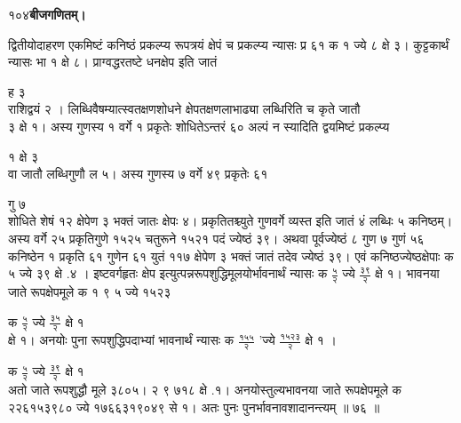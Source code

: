 \documentclass[11pt, openany]{book}
\begin{document}
\onehalfspacing
१०४\hspace{2in}\textbf{बीजगणितम्।} 

\vspace{5mm}

\begin{sloppypar}

\hangindent=0.2in द्वितीयोदाहरण एकमिष्टं कनिष्ठं प्रकल्प्य रूपत्रयं क्षेपं च प्रकल्प्य न्यासः प्र ६१ क १ ज्ये ८ क्षे ३। कुट्टकार्थं न्यासः भा १ क्षे ८। प्राग्वद्धरतष्टे धनक्षेप इति जातं 

\hspace{1.25in}ह ३\\ 

\hangindent=0.2in राशिद्वयं २ । लिब्धिवैषम्यात्स्वतक्षणशोधने क्षेपतक्षणलाभाढ्या लब्धिरिति च कृते जातौ \\३ क्षे १। अस्य गुणस्य १ वर्गे १ प्रकृतेः शोधितेऽन्तरं ६० अल्पं न स्यादिति द्वयमिष्टं प्रकल्प्य

१ क्षे ३\\

\hangindent=0.2in वा जातौ लब्धिगुणौ ल ५। अस्य गुणस्य ७ वर्गे ४९ प्रकृतेः ६१

\hspace{1.25in}गु ७\\

\hangindent=0.2in शोधिते शेषं १२ क्षेपेण ३ भक्तं जातः क्षेपः ४। प्रकृतितश्च्युते गुणवर्गे व्यस्त इति जातं ४ं लब्धिः ५ कनिष्ठम्। अस्य वर्गे २५ प्रकृतिगुणे १५२५ चतुरूने १५२१ पदं ज्येष्ठं ३९। अथवा पूर्वज्येष्ठं ८ गुण ७ गुणं ५६ कनिष्ठेन १ प्रकृति ६१ गुणेन ६१ युतं ११७ क्षेपेण ३ भक्तं जातं तदेव ज्येष्ठं ३९। एवं कनिष्ठज्येष्ठक्षेपाः क ५ ज्ये ३९ क्षे .४ । इष्टवर्गहृतः क्षेप इत्युत्पन्नरूपशुद्धिमूलयोर्भावनार्थं न्यासः
क $\frac{\mbox{५}}{\mbox{२}}$ ज्ये $\frac{\mbox{३९}}{\mbox{२}}$ क्षे १। भावनया जाते रूपक्षेपमूले क १ ९ ५ ज्ये १५२३

क $\frac{\mbox{५}}{\mbox{२}}$ ज्ये $\frac{\mbox{३५}}{\mbox{२}}$ क्षे १\\

\hangindent=0.2in क्षे १। अनयोः पुना रूपशुद्धिपदाभ्यां भावनार्थं न्यासः क $\frac{\mbox{१५५}}{\mbox{२}}$ 'ज्ये $\frac{\mbox{१५२३}}{\mbox{२}}$ क्षे १ । 

\hspace{3.3in}क \hspace{0.15in}$\frac{\mbox{५}}{\mbox{२}}$ \hspace{0.05in}ज्ये $\frac{\mbox{३९}}{\mbox{२}}$ क्षे १\\

\hangindent=0.2in अतो जाते रूपशुद्धौ मूले ३८०५। २ ९ ७१८ क्षे .१। अनयोस्तुल्यभावनया जाते रूपक्षेपमूले क २२६१५३९८० ज्ये १७६६३१९०४९ से १। अतः पुनः पुनर्भावनावशादानन्त्यम् ॥ ७६ ॥


\end{sloppypar}
\end{document}
